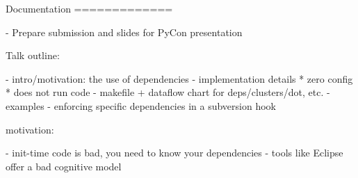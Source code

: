 

Documentation
=============

- Prepare submission and slides for PyCon presentation

  Talk outline:

  - intro/motivation: the use of dependencies
  - implementation details
    * zero config
    * does not run code
  - makefile + dataflow chart for deps/clusters/dot, etc.
  - examples
  - enforcing specific dependencies in a subversion hook





motivation:

- init-time code is bad, you need to know your dependencies
- tools like Eclipse offer a bad cognitive model

